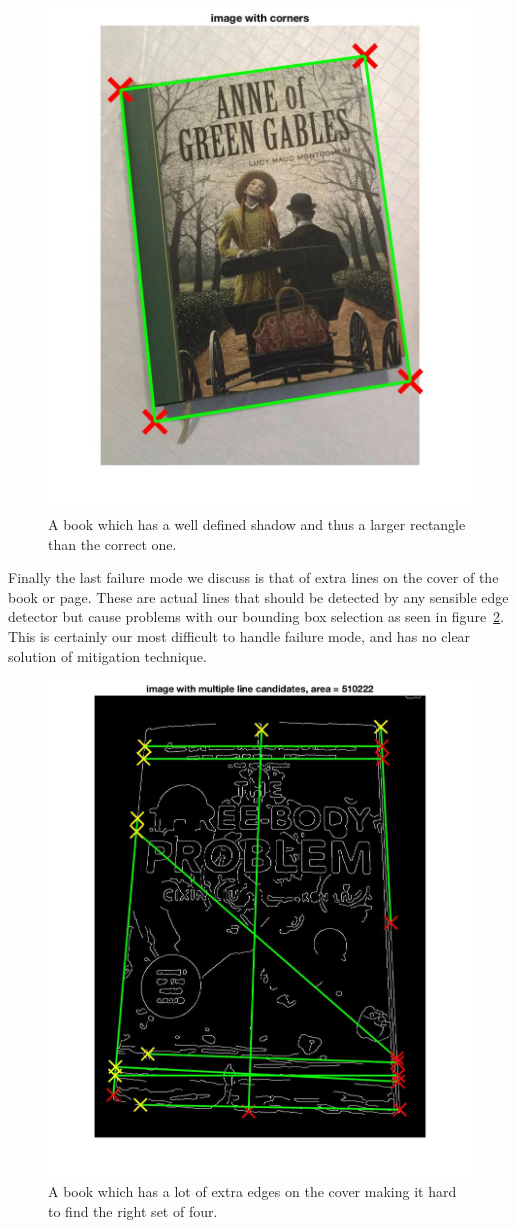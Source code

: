 \begin{figure}[t]
\begin{center}
   \includegraphics[width=0.8\linewidth]{figures/shadowError.jpg}
\end{center}
\caption{A book which has a well defined shadow and thus a larger rectangle than the correct one.}
\label{fig:shadowError}
\end{figure}

Finally the last failure mode we discuss is that of extra lines on the cover of the book or page.
These are actual lines that should be detected by any sensible edge detector but cause problems with our bounding box selection as seen in figure~\ref{fig:extraEdges}.
This is certainly our most difficult to handle failure mode, and has no clear solution of mitigation technique.

\begin{figure}[t]
\begin{center}
   \includegraphics[width=0.8\linewidth]{figures/extraEdges.jpg}
\end{center}
\caption{A book which has a lot of extra edges on the cover making it hard to find the right set of four.}
\label{fig:extraEdges}
\end{figure}

